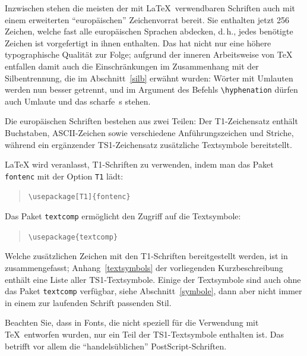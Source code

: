 Inzwischen stehen die meisten der mit \LaTeX\ verwendbaren Schriften
auch mit einem erweiterten "`europäischen"' Zeichenvorrat bereit.
Sie enthalten jetzt 256 Zeichen, welche fast
alle europäischen Sprachen abdecken, d.\,h., jedes benötigte
Zeichen ist vorgefertigt in ihnen enthalten.
Das hat nicht nur eine
höhere typographische Qualität zur Folge; aufgrund der inneren Arbeitsweise
von \TeX{} entfallen damit auch die Einschränkungen im Zusammenhang mit
der Silbentrennung, die im Abschnitt~\ref{silb} erwähnt wurden:
Wörter mit Umlauten werden nun besser getrennt, und im Argument des
Befehls \lstinline|\hyphenation| dürfen auch Umlaute und das scharfe~s stehen.


Die europäischen Schriften bestehen aus zwei Teilen: Der T1-Zeichensatz
enthält Buchstaben, ASCII-Zeichen sowie verschiedene Anführungszeichen
und Striche, 
während ein ergänzender TS1-Zeichensatz zusätzliche Textsymbole bereitstellt.

\LaTeX{} wird veranlasst, T1-Schriften zu verwenden,
indem man das Paket \texttt{fontenc} mit der Option \texttt{T1} lädt:
\begin{quote}
  \lstinline|\usepackage[T1]{fontenc}|
\end{quote}
Das Paket \texttt{textcomp} ermöglicht den Zugriff auf die Textsymbole:
\begin{quote}
  \lstinline|\usepackage{textcomp}|
\end{quote}
Welche zusätzlichen Zeichen mit den T1-Schriften
bereitgestellt werden, ist in \cite{usrguide} zusammengefasst;
Anhang~\ref{textsymbols} der vorliegenden Kurzbeschreibung
enthält eine Liste aller TS1-Textsymbole.  Einige der Textsymbole sind
auch ohne das Paket \texttt{textcomp} verfügbar, siehe Abschnitt~\ref{symbole},
dann aber nicht immer in einem zur laufenden Schrift passenden Stil.

Beachten Sie, dass in Fonts, die nicht speziell für die Verwendung 
mit \TeX\ entworfen wurden, 
nur ein Teil der TS1-Textsymbole enthalten ist.
Das betrifft vor allem die "`handelsüblichen"' PostScript-Schriften.

\endinput

